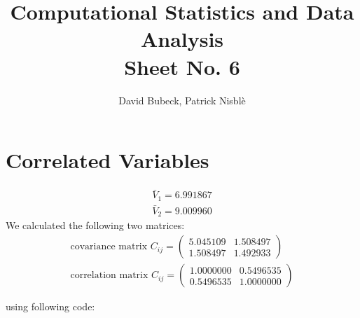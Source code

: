 \documentclass[11pt, a4paper, reqno]{scrartcl}
\begin{document}
    \title{Computational Statistics and Data Analysis\\Sheet No. 6}
    \author{David Bubeck, Patrick Nisbl\`e}
    \maketitle
    \section{Correlated Variables}
    \begin{align}
        \bar V_1 = 6.991867\\
        \bar V_2 = 9.009960
    \end{align}
    We calculated the following two matrices:
    \begin{align}
        \text{covariance matrix }C_{ij} = \begin{pmatrix}
            5.045109 & 1.508497\\
            1.508497 & 1.492933
        \end{pmatrix}\\
        \text{correlation matrix }C_{ij} = \begin{pmatrix}
            1.0000000 & 0.5496535\\
            0.5496535 & 1.0000000
        \end{pmatrix}
    \end{align}
    
    using following code:
    \begin{figure}[H]
        
    \end{figure}
    \begin{figure}
        
    \end{figure}
\end{document}
